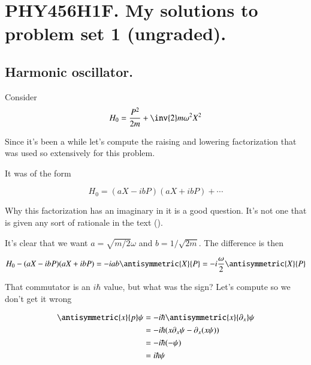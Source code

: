 %
%

\chapter{PHY456H1F.  My solutions to problem set 1 (ungraded).}
\label{chap:phy456ps1}
{}
\date{Sept 12, 2011}

\beginArtWithToc

\section{Harmonic oscillator.}

Consider
\begin{equation}\label{eqn:phy456ps1:10}
H_0 = \frac{P^2}{2m} + \inv{2} m \omega^2 X^2
\end{equation}

Since it's been a while let's compute the raising and lowering factorization that was used so extensively for this problem.

It was of the form

\begin{equation}\label{eqn:phy456ps1:30}
H_0 = (a X - i b P)(a X + i b P) + \cdots
\end{equation}

Why this factorization has an imaginary in it is a good question.  It's not one that is given any sort of rationale in the text (\cite{desai2009quantum}).

It's clear that we want $a = \sqrt{m/2} \omega$ and $b = 1/\sqrt{2m}$.  The difference is then

\begin{equation}\label{eqn:phy456ps1:50}
H_0 - (a X - i b P)(a X + i b P)
=
- i a b \antisymmetric{X}{P}  = - i \frac{\omega}{2} \antisymmetric{X}{P}
\end{equation}

That commutator is an $i\hbar$ value, but what was the sign?  Let's compute so we don't get it wrong

\begin{align*}
\antisymmetric{x}{ p} \psi
&= -i \hbar \antisymmetric{x}{\partial_x} \psi \\
&= -i \hbar ( x \partial_x \psi - \partial_x (x \psi) ) \\
&= -i \hbar ( - \psi ) \\
&= i \hbar \psi
\end{align*}

